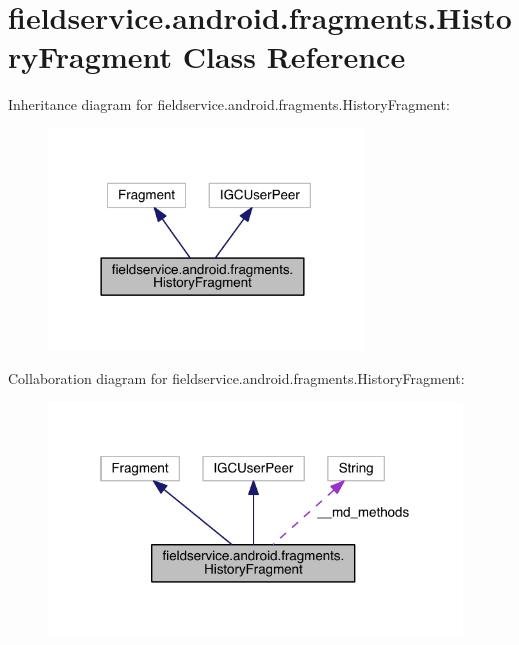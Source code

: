 \hypertarget{classfieldservice_1_1android_1_1fragments_1_1_history_fragment}{\section{fieldservice.\+android.\+fragments.\+History\+Fragment Class Reference}
\label{classfieldservice_1_1android_1_1fragments_1_1_history_fragment}
}


Inheritance diagram for fieldservice.\+android.\+fragments.\+History\+Fragment\+:
\nopagebreak
\begin{figure}[H]
\begin{center}
\leavevmode
\includegraphics[width=237pt]{classfieldservice_1_1android_1_1fragments_1_1_history_fragment__inherit__graph}
\end{center}
\end{figure}


Collaboration diagram for fieldservice.\+android.\+fragments.\+History\+Fragment\+:
\nopagebreak
\begin{figure}[H]
\begin{center}
\leavevmode
\includegraphics[width=311pt]{classfieldservice_1_1android_1_1fragments_1_1_history_fragment__coll__graph}
\end{center}
\end{figure}
